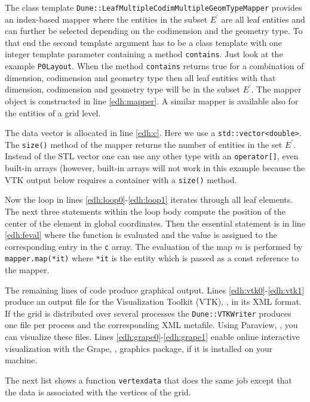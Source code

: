 \documentclass[11pt,a4paper,headinclude,footinclude,DIV16,normalheadings]{scrreprt}
\begin{document}
The class template
\lstinline!Dune::LeafMultipleCodimMultipleGeomTypeMapper!  provides an
index-based mapper where the entities in the subset $E^\prime$ are all
leaf entities and can further be selected depending on the codimension
and the geometry type. To that end the second template argument has to
be a class template with one integer template parameter containing a
method \lstinline!contains!. Just look at the example
\lstinline!P0Layout!. When the method \lstinline!contains!  returns
true for a combination of dimension, codimension and geometry type
then all leaf entities with that dimension, codimension and geometry
type will be in the subset $E^\prime$. The mapper object is
constructed in line \ref{edh:mapper}. A similar mapper is available
also for the entities of a grid level.

The data vector is allocated in line \ref{edh:c}. Here we use a
\lstinline!std::vector<double>!. The \lstinline!size()! method of the
mapper returns the number of entities in the set $E^\prime$. Instead
of the STL vector one can use any other type with an
\lstinline!operator[]!, even built-in arrays (however, built-in arrays
will not work in this example because the VTK output
below requires a container with a
\lstinline!size()! method. 

Now the loop in lines \ref{edh:loop0}-\ref{edh:loop1} iterates through
all leaf elements. The next three statements within the loop body
compute the position of the center of the element in global
coordinates. Then the essential statement is in line \ref{edh:feval}
where the function is evaluated and the value is assigned to the
corresponding entry in the \lstinline!c! array. The evaluation of the
map $m$ is performed by \lstinline!mapper.map(*it)!  where
\lstinline!*it! is the entity which is passed as a const reference to
the mapper.

The remaining lines of code produce graphical output. Lines
\ref{edh:vtk0}-\ref{edh:vtk1} produce an output file for the
Visualization Toolkit (VTK), \cite{VTK}, in its XML format. If the
grid is distributed over several processes the
\lstinline!Dune::VTKWriter! produces one file per process and the
corresponding XML metafile. Using Paraview, \cite{Paraview}, you can
visualize these files. Lines \ref{edh:grape0}-\ref{edh:grape1} enable
online interactive visualization with the Grape, \cite{Grape},
graphics package, if it is installed on your machine.

The next list shows a function \lstinline!vertexdata! that does the
same job except that the data is associated with the vertices of the
grid. 
\end{document}

